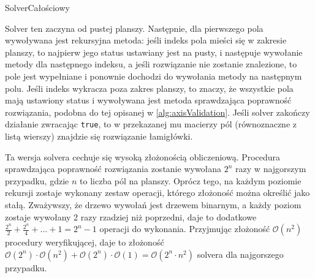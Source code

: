 \begin{pseudokod}[H]
    \caption{SolverCałościowy}\label{alg:allSolver}
\end{pseudokod}

    Solver ten zaczyna od pustej planszy. Następnie, dla pierwszego pola wywoływana jest rekursyjna
metoda: jeśli indeks pola mieści się w zakresie planszy, to najpierw jego status ustawiany jest na
pusty, i następuje wywołanie metody dla następnego indeksu, a jeśli rozwiązanie nie zostanie znalezione,
to pole jest wypełniane i ponownie dochodzi do wywołania metody na następnym polu. Jeśli indeks
wykracza poza zakres planszy, to znaczy, że wszystkie pola mają ustawiony status i wywoływana jest
metoda sprawdzająca poprawność rozwiązania, podobna do tej opisanej w \ref{alg:axisValidation}.
Jeśli solver zakończy działanie zwracając \texttt{true}, to w przekazanej mu macierzy pól 
(równoznaczne z listą wierszy) znajdzie się rozwiązanie łamigłówki.

    Ta wersja solvera cechuje się wysoką złożonością obliczeniową. Procedura sprawdzająca poprawność
rozwiązania zostanie wywołana $2^n$ razy w najgorszym przypadku, gdzie $n$ to liczba pól na planszy.
Oprócz tego, na każdym poziomie rekursji zostaje wykonany zestaw operacji, którego złożoność można
określić jako stałą. Zważywszy, że drzewo wywołań jest drzewem binarnym, a każdy poziom zostaje
wywołany 2 razy rzadziej niż poprzedni, daje to dodatkowe 
$\frac{2^n}{2} + \frac{2^n}{4} + \ldots + 1 = 2^n - 1$ operacji do wykonania. Przyjmując złożoność
$\mathcal{O}(n^2)$ procedury weryfikującej, daje to złożoność
$\mathcal{O}(2^n) \cdot \mathcal{O}(n^2) + \mathcal{O}(2^n) \cdot \mathcal{O}(1) = \mathcal{O}(2^n \cdot n^2)$
solvera dla najgorszego przypadku.


